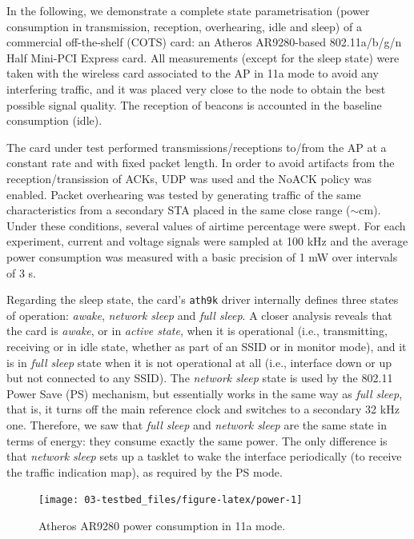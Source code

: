 \documentclass[twoside,nohyper]{tufte-book}
\theoremstyle{definition}
\theoremstyle{definition}
\theoremstyle{definition}
\theoremstyle{remark}
\begin{document}
In the following, we demonstrate a complete state parametrisation (power
consumption in transmission, reception, overhearing, idle and sleep) of
a commercial off-the-shelf (COTS) card: an Atheros AR9280-based
802.11a/b/g/n Half Mini-PCI Express card. All measurements (except for
the sleep state) were taken with the wireless card associated to the AP
in 11a mode to avoid any interfering traffic, and it was placed very
close to the node to obtain the best possible signal quality. The
reception of beacons is accounted in the baseline consumption (idle).

The card under test performed transmissions/receptions to/from the AP at
a constant rate and with fixed packet length. In order to avoid
artifacts from the reception/transission of ACKs, UDP was used and the
NoACK policy was enabled. Packet overhearing was tested by generating
traffic of the same characteristics from a secondary STA placed in the
same close range (\(\sim\)cm). Under these conditions, several values of
airtime percentage were swept. For each experiment, current and voltage
signals were sampled at 100 kHz and the average power consumption was
measured with a basic precision of 1 mW over intervals of 3 s.

\pagebreak Regarding the sleep state, the card's \texttt{ath9k} driver
internally defines three states of operation: \emph{awake},
\emph{network sleep} and \emph{full sleep}. A closer analysis reveals
that the card is \emph{awake}, or in \emph{active state}, when it is
operational (i.e., transmitting, receiving or in idle state, whether as
part of an SSID or in monitor mode), and it is in \emph{full sleep}
state when it is not operational at all (i.e., interface down or up but
not connected to any SSID). The \emph{network sleep} state is used by
the 802.11 Power Save (PS) mechanism, but essentially works in the same
way as \emph{full sleep}, that is, it turns off the main reference clock
and switches to a secondary 32 kHz one. Therefore, we saw that
\emph{full sleep} and \emph{network sleep} are the same state in terms
of energy: they consume exactly the same power. The only difference is
that \emph{network sleep} sets up a tasklet to wake the interface
periodically (to receive the traffic indication map), as required by the
PS mode.



\begin{figure}

{\centering \texttt{[image: 03-testbed\_files/figure-latex/power-1]} 

}

\caption[Atheros AR9280 power consumption in 11a mode.]{Atheros AR9280 power consumption in 11a mode.}\label{fig:power}
\end{figure}
\end{document}
